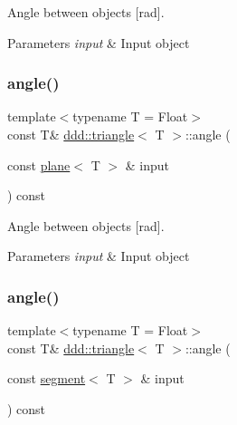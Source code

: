 Angle between objects \mbox{[}rad\mbox{]}. 


\begin{DoxyParams}{Parameters}
{\em input} & Input object \\
\hline
\end{DoxyParams}
\mbox{\label{classddd_1_1triangle_a0500bf1ca10c82a24b6d61ade86b1f19}} 
\subsubsection{\texorpdfstring{angle()}{angle()}\hspace{0.1cm}{\footnotesize\ttfamily [4/5]}}
{\footnotesize\ttfamily template$<$typename T = Float$>$ \\
const T\& \hyperlink{classddd_1_1triangle}{ddd\+::triangle}$<$ T $>$\+::angle (\begin{DoxyParamCaption}\item[{const \hyperlink{classddd_1_1plane}{plane}$<$ T $>$ \&}]{input }\end{DoxyParamCaption}) const\hspace{0.3cm}{\ttfamily [inline]}}



Angle between objects \mbox{[}rad\mbox{]}. 


\begin{DoxyParams}{Parameters}
{\em input} & Input object \\
\hline
\end{DoxyParams}
\mbox{\label{classddd_1_1triangle_afcb7c775aada1ae8b396742d0f36ac51}} 
\subsubsection{\texorpdfstring{angle()}{angle()}\hspace{0.1cm}{\footnotesize\ttfamily [5/5]}}
{\footnotesize\ttfamily template$<$typename T = Float$>$ \\
const T\& \hyperlink{classddd_1_1triangle}{ddd\+::triangle}$<$ T $>$\+::angle (\begin{DoxyParamCaption}\item[{const \hyperlink{classddd_1_1segment}{segment}$<$ T $>$ \&}]{input }\end{DoxyParamCaption}) const\hspace{0.3cm}{\ttfamily [inline]}}



